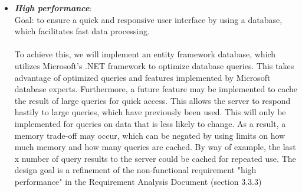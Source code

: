 \begin{itemize}
\item \textit{\bf{High performance}}: 
\\
Goal: to ensure a quick and responsive user interface by using a database, which facilitates fast data processing.  
\\\\
To achieve this, we will implement an entity framework database, which utilizes Microsoft's .NET framework to optimize database queries. This takes advantage of optimized queries and features implemented by Microsoft database experts. Furthermore, a future feature may be implemented to cache the result of large queries for quick access. This allows the server to respond hastily to large queries, which have previously been used. This will only be implemented for queries on data that is less likely to change. As a result, a memory trade-off may occur, which can be negated by using limits on how much memory and how many queries are cached. By way of example, the last x number of query results to the server could be cached for repeated use. The design goal is a refinement of the non-functional requirement "high performance" in the Requirement Analysis Document (section 3.3.3)

\end{itemize}
